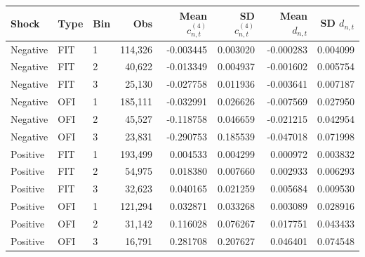 \begin{tabular}{lllrrrrr}
\toprule
Shock & Type & Bin & Obs & Mean $c^{(4)}_{n,t}$ & SD $c^{(4)}_{n,t}$ & Mean $d_{n,t}$ & SD $d_{n,t}$ \\
\midrule
Negative & FIT & 1 & 114,326 & -0.003445 & 0.003020 & -0.000283 & 0.004099 \\
Negative & FIT & 2 & 40,622 & -0.013349 & 0.004937 & -0.001602 & 0.005754 \\
Negative & FIT & 3 & 25,130 & -0.027758 & 0.011936 & -0.003641 & 0.007187 \\
Negative & OFI & 1 & 185,111 & -0.032991 & 0.026626 & -0.007569 & 0.027950 \\
Negative & OFI & 2 & 45,527 & -0.118758 & 0.046659 & -0.021215 & 0.042954 \\
Negative & OFI & 3 & 23,831 & -0.290753 & 0.185539 & -0.047018 & 0.071998 \\
\addlinespace
Positive & FIT & 1 & 193,499 & 0.004533 & 0.004299 & 0.000972 & 0.003832 \\
Positive & FIT & 2 & 54,975 & 0.018380 & 0.007660 & 0.002933 & 0.006293 \\
Positive & FIT & 3 & 32,623 & 0.040165 & 0.021259 & 0.005684 & 0.009530 \\
Positive & OFI & 1 & 121,294 & 0.032871 & 0.033268 & 0.003089 & 0.028916 \\
Positive & OFI & 2 & 31,142 & 0.116028 & 0.076267 & 0.017751 & 0.043433 \\
Positive & OFI & 3 & 16,791 & 0.281708 & 0.207627 & 0.046401 & 0.074548 \\
\bottomrule
\end{tabular}
